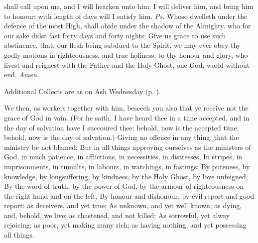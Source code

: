 
\introit
{} shall call upon me, and I will hearken unto him: I will deliver him, and bring him to honour: with length of days will I satisfy him. \textit{Ps.} Whoso dwelleth under the defence of the most High, shall abide under the shadow of the Almighty.
\collect
{} who for our sake didst fast forty days and forty nights; Give us grace to use such abstinence, that, our flesh being subdued to the Spirit, we may ever obey thy godly motions in righteousness, and true holiness, to thy honour and glory, who livest and reignest with the Father and the Holy Ghost, one God, world without end. \textit{Amen.}
\begin{rubric}
    Additional Collects are as on Ash Wednesday (p. \pageref{AshWednesdayMass}).
\end{rubric}
 We then, as workers together with him, beseech you also that ye receive not the grace of God in vain. (For he saith, I have heard thee in a time accepted, and in the day of salvation have I succoured thee: behold, now is the accepted time; behold, now is the day of salvation.) Giving no offence in any thing, that the ministry be not blamed: But in all things approving ourselves as the ministers of God, in much patience, in afflictions, in necessities, in distresses, In stripes, in imprisonments, in tumults, in labours, in watchings, in fastings; By pureness, by knowledge, by longsuffering, by kindness, by the Holy Ghost, by love unfeigned, By the word of truth, by the power of God, by the armour of righteousness on the right hand and on the left, By honour and dishonour, by evil report and good report: as deceivers, and yet true; As unknown, and yet well known; as dying, and, behold, we live; as chastened, and not killed; As sorrowful, yet alway rejoicing; as poor, yet making many rich; as having nothing, and yet possessing all things.
